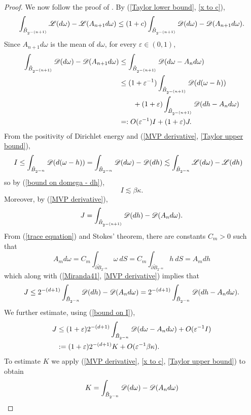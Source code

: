 \begin{proof}
We now follow the proof of \cite[Lemma 4.2]{Miranda66}.
By (\ref{Taylor lower bound}, \ref{x to c}),
$$\int_{\tilde B_{2^{-(n + 1)}}} \mathscr L(d\omega) - \mathscr L(A_{n + 1}d\omega) \leq (1 + c)\int_{\tilde B_{2^{-(n + 1)}}} \mathscr D(d\omega) - \mathscr D(A_{n + 1}d\omega).$$
Since $A_{n + 1}d\omega$ is the mean of $d\omega$, for every $\varepsilon \in (0, 1)$,
\begin{align*}
\int_{\tilde B_{2^{-(n + 1)}}} \mathscr D(d\omega) - \mathscr D(A_{n + 1}d\omega)
&\leq \int_{\tilde B_{2^{-(n + 1)}}} \mathscr D(d\omega - A_nd\omega) \\
&\leq (1 + \varepsilon^{-1}) \int_{\tilde B_{2^{-(n + 1)}}} \mathscr D(d(\omega - h)) \\
&\qquad +(1 + \varepsilon) \int_{\tilde B_{2^{-(n + 1)}}} \mathscr D(dh - A_nd\omega) \\
&=: O(\varepsilon^{-1}) I + (1 + \varepsilon) J.
\end{align*}
From the positivity of Dirichlet energy and (\ref{MVP derivative}, \ref{Taylor upper bound}),
\begin{align*}
I &\leq \int_{\tilde B_{2^{-n}}} \mathscr D(d(\omega - h)) = \int_{\tilde B_{2^{-n}}} \mathscr D(d\omega) - \mathscr D(dh) \lesssim \int_{\tilde B_{2^{-n}}} \mathscr L(d\omega) - \mathscr L(dh)
\end{align*}
so by (\ref{bound on domega - dh}),
\begin{equation}\label{bound on I}
I \lesssim \beta\kappa.
\end{equation}
Moreover, by (\ref{MVP derivative}),
$$J = \int_{\tilde B_{2^{-(n + 1)}}} \mathscr D(dh) - \mathscr D(A_nd\omega).$$
From (\ref{trace equation}) and Stokes' theorem, there are constants $C_m > 0$ such that
$$A_m d\omega = C_m \int_{\partial \tilde B_{2^{-m}}} \omega ~dS = C_m \int_{\partial \tilde B_{2^{-m}}} h ~dS = A_m dh$$
which along with (\ref{Miranda41}, \ref{MVP derivative}) implies that
$$J \leq 2^{-(d + 1)} \int_{\tilde B_{2^{-n}}} \mathscr D(dh) - \mathscr D(A_nd\omega) = 2^{-(d + 1)} \int_{\tilde B_{2^{-n}}} \mathscr D(dh - A_n d\omega).$$
We further estimate, using (\ref{bound on I}),
\begin{align*}
J &\leq (1 + \varepsilon) 2^{-(d + 1)} \int_{\tilde B_{2^{-n}}} \mathscr D(d\omega - A_n d\omega) + O(\varepsilon^{-1} I) \\
&:= (1 + \varepsilon) 2^{-(d + 1)} K + O(\varepsilon^{-1} \beta \kappa).
\end{align*}
To estimate $K$ we apply (\ref{MVP derivative}, \ref{x to c}, \ref{Taylor upper bound}) to obtain
\begin{align*}
K &= \int_{\tilde B_{2^{-n}}} \DirL(d\omega) - \DirL(A_n d\omega) \\

\end{align*}
\end{proof}
